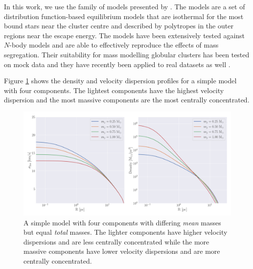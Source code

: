 In this work, we use the  family of models presented by \citet{Gieles2015}. The
 models are a set of distribution function-based equilibrium models that are isothermal
for the most bound stars near the cluster centre and described by polytropes in the outer regions
near the escape energy. The models have been extensively tested against $N$-body models
\citep{Zocchi2016, Peuten2017} and are able to effectively reproduce the effects of mass
segregation. Their suitability for mass modelling globular clusters has been tested on mock data
\citep{Henault-Brunet2019} and they have recently been applied to real datasets as well
\citep[e.g.][]{Gieles2018, Henault-Brunet2020}.

Figure \ref{fig:1/limepy_demo} shows the density and velocity dispersion profiles for a simple
 model with four components. The lightest components have the highest velocity
dispersion and the most massive components are the most centrally concentrated.

\begin{figure}
	\centering
	\includegraphics[width=1.0\textwidth]{figures/limepy_demo.png}
	\caption{A simple  model with four components with differing \emph{mean} masses
		but equal \emph{total} masses. The lighter components have higher velocity
		dispersions and are less centrally concentrated while the more massive components
		have lower velocity dispersions and are more centrally concentrated.}
	\label{fig:1/limepy_demo}
\end{figure}


